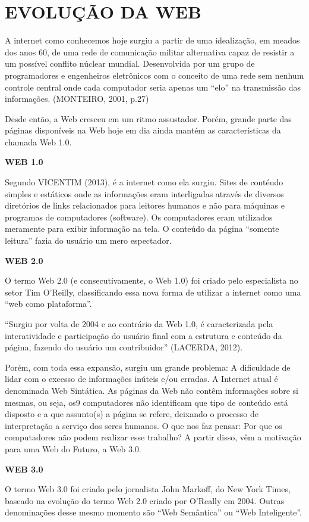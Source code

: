 \section{EVOLUÇÃO DA WEB}
A internet como conhecemos hoje surgiu a partir de uma idealização, em meados dos
anos 60, de uma rede de comunicação militar alternativa capaz de resistir a um possível
conflito núclear mundial. Desenvolvida por um grupo de programadores e engenheiros
eletrônicos com o conceito de uma rede sem nenhum controle central onde cada
computador seria apenas um “elo” na transmissão das informações. (MONTEIRO, 2001,
p.27)

Desde então, a Web cresceu em um ritmo assustador. Porém, grande parte das páginas
disponíveis na Web hoje em dia ainda mantém as características da chamada Web 1.0.

\textbf{WEB 1.0}

Segundo VICENTIM (2013), é a internet como ela surgiu. Sites de contéudo simples e
estáticos onde as informações eram interligadas através de diversos diretórios de links
relacionados para leitores humanos e não para máquinas e programas de computadores
(software). Os computadores eram utilizados meramente para exibir informação na tela. O
conteúdo da página “somente leitura” fazia do usuário um mero espectador.

\textbf{WEB 2.0}

O termo Web 2.0 (e consecutivamente, o Web 1.0) foi criado pelo especialista no setor
Tim O’Reilly, classificando essa nova forma de utilizar a internet como uma “web como
plataforma”.

“Surgiu por volta de 2004 e ao contrário da Web 1.0, é caracterizada pela interatividade e
participação do usuário final com a estrutura e conteúdo da página, fazendo do usuário um
contribuidor” (LACERDA, 2012).

Porém, com toda essa expansão, surgiu um grande problema: A dificuldade de lidar
com o excesso de informações inúteis e/ou erradas. A Internet atual é denominada Web
Sintática. As páginas da Web não contêm informações sobre si mesmas, ou seja, os9
computadores não identificam que tipo de conteúdo está disposto e a que assunto(s) a
página se refere, deixando o processo de interpretação a serviço dos seres humanos. O que
nos faz pensar: Por que os computadores não podem realizar esse trabalho?
A partir disso, vêm a motivação para uma Web do Futuro, a Web 3.0.

\textbf{WEB 3.0}

O termo Web 3.0 foi criado pelo jornalista John Markoff, do New York Times, baseado
na evolução do termo Web 2.0 criado por O’Really em 2004. Outras denominações desse
mesmo momento são “Web Semântica” ou “Web Inteligente”.

